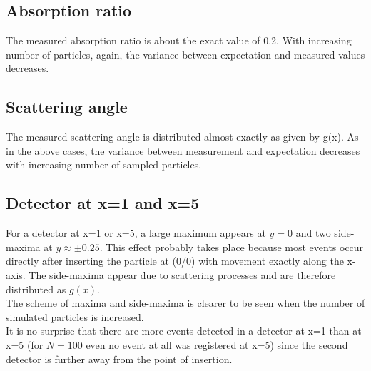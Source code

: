 \documentclass{article}
\begin{document}
	\subsection{Absorption ratio}
		The measured absorption ratio is about the exact value of 0.2. With increasing number of particles, again, the variance between expectation and measured values decreases.
	\subsection{Scattering angle}
		The measured scattering angle is distributed almost exactly as given by g(x). As in the above cases, the variance between measurement and expectation decreases with increasing number of sampled particles.
	\subsection{Detector at x=1 and x=5}
		For a detector at x=1 or x=5, a large maximum appears at $y=0$ and two side-maxima at $y\approx\pm0.25$. This effect probably takes place because most events occur directly after inserting the particle at (0/0) with movement exactly along the x-axis. The side-maxima appear due to scattering processes and are therefore distributed as $g(x)$.\\
		The scheme of maxima and side-maxima is clearer to be seen when the number of simulated particles is increased.\\
		It is no surprise that there are more events detected in a detector at x=1 than at x=5 (for $N=100$ even no event at all was registered at x=5) since the second detector is further away from the point of insertion.
\end{document}
